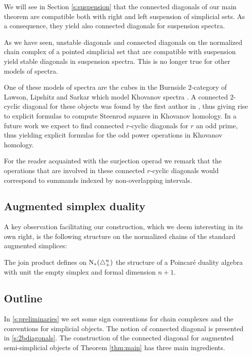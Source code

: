 We will see in Section \ref{s:suspension} that the connected diagonals of our main theorem are compatible both with right and left suspension of simplicial sets.
As a consequence, they yield also connected diagonals for suspension spectra.

As we have seen, unstable diagonals and connected diagonals on the normalized chain complex of a pointed simplicial set that are compatible with suspension yield stable diagonals in suspension spectra. This is no longer true for other models of spectra.

One of these models of spectra are the cubes in the Burnside $2$-category of Lawson, Lipshitz and Sarkar \cite{LLS20} which model Khovanov spectra \cite{LS14}. A connected $2$-cyclic diagonal for these objects was found by the first author in \cite{cantero-moran2020khovanov}, thus giving rise to explicit formulas to compute Steenrod squares in Khovanov homology. In a future work we expect to find connected $r$-cyclic diagonals for $r$ an odd prime, thus yielding explicit formulas for the odd power operations in Khovanov homology.

For the reader acquainted with the surjection operad we remark that the operations that are involved in these connected $r$-cyclic diagonals would correspond to summands indexed by non-overlapping intervals.

\subsection{Augmented simplex duality}

A key observation facilitating our construction, which we deem interesting in its own right, is the following structure on the normalized chains of the standard augmented simplices:

\begin{theorem}
	The join product defines on $\operatorname{N}_{*}(\triangle_{+}^{n})$ the structure of a Poincar\'e duality algebra with unit the empty simplex and formal dimension $n+1$.
\end{theorem}

\subsection{Outline}

In \cref{s:preliminaries} we set some sign conventions for chain complexes and the conventions for simplicial objects.
The notion of connected diagonal is presented in \cref{s:2bdiagonals}.
The construction of the connected diagonal for augmented semi-simplicial objects of Theorem \ref{thm:main} has three main ingredients.


